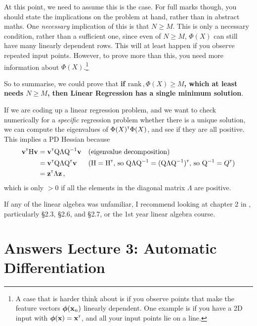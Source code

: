 At this point, we need to assume this is the case. For full marks though, you should state the implications on the problem at hand, rather than in abstract maths. One \emph{necessary} implication of this is that $N\geq M$. This is only a necessary condition, rather than a sufficient one, since even of $N \geq M$, $\Phi(X)$ can still have many linearly dependent rows. This will at least happen if you observe repeated input points. However, to prove more than this, you need more information about $\Phi(X)$.\footnote{A case that is harder think about is if you observe points that make the feature vectors $\boldsymbol{\phi}(\mathbf{x}_n)$ linearly dependent. One example is if you have a 2D input with $\boldsymbol{\phi}(\mathbf{x}) = \mathbf{x}^\mathrm{\textsf{\tiny T}}$, and all your input points lie on a line.}

So to summarise, we could prove that \textbf{if $\mathrm{rank}\,, \Phi(X) \geq M$, which at least needs $N\geq M$, then Linear Regression has a single minimum solution}.

If we are coding up a linear regression problem, and we want to check numerically for a \emph{specific} regression problem whether there is a unique solution, we can compute the eigenvalues of $\Phi(X)^\mathrm{\textsf{\tiny T}}\Phi(X)$, and see if they are all positive. This implies a PD Hessian because
\begin{align}
\mathbf{v}^\mathrm{\textsf{\tiny T}} {\mathrm{{H}}} \mathbf{v} &= \mathbf{v}^\mathrm{\textsf{\tiny T}} {\mathrm{{Q}}} {\mathrm{{\Lambda}}} {\mathrm{{Q}}}^{-1} \mathbf{v} && \text{(eigenvalue decomposition)} \\
&= \mathbf{v}^\mathrm{\textsf{\tiny T}} {\mathrm{{Q}}} {\mathrm{{\Lambda}}} {\mathrm{{Q}}}^\mathrm{\textsf{\tiny T}}\mathbf{v} && \text{(${\mathrm{{H}}} = {\mathrm{{H}}}^\mathrm{\textsf{\tiny T}}$, so ${\mathrm{{Q}}}{\mathrm{{\Lambda}}} {\mathrm{{Q}}}^{-1} = ({\mathrm{{Q}}}{\mathrm{{\Lambda}}} {\mathrm{{Q}}}^{-1})^\mathrm{\textsf{\tiny T}}$, so ${\mathrm{{Q}}}^{-1} = Q^\mathrm{\textsf{\tiny T}}$)}\\
&= \mathbf{z}^\mathrm{\textsf{\tiny T}} \Lambda \mathbf{z} \,,
\end{align}
which is only $> 0$ if all the elements in the diagonal matrix $\Lambda$ are positive.

If any of the linear algebra was unfamiliar, I recommend looking at chapter 2 in \citet{mml}, particularly \S2.3, \S2.6, and \S2.7, or the 1st year linear algebra course.


\section{Answers Lecture 3: Automatic Differentiation}



